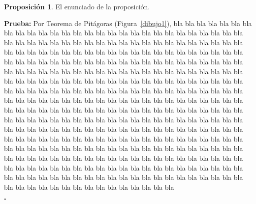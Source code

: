 \documentclass[12pt]{book}%
\theoremstyle{definition}%
\newtheorem{prop}{Proposición}[chapter]
\newenvironment{pba}{\noindent\textbf{Prueba:}}{\begin{flushright} $\square$ \end{flushright}}
\begin{document}
\begin{prop}\label{prop}
El enunciado de la proposición.
\end{prop}
\begin{pba}
Por Teorema de Pitágoras (Figura~\ref{dibujo1}), bla bla bla bla bla bla bla bla bla bla bla bla bla bla bla bla bla bla bla bla bla bla bla bla bla bla bla bla bla bla bla bla bla bla bla bla bla bla bla bla bla bla bla bla bla bla bla bla bla bla bla bla bla bla bla bla bla bla bla bla bla bla bla bla bla bla bla bla bla bla bla bla bla bla bla bla bla bla bla bla bla bla bla bla bla bla bla bla bla bla bla bla bla bla bla bla bla bla bla bla bla bla bla bla bla bla bla bla bla bla bla bla bla bla bla bla bla bla bla bla bla bla bla bla bla bla bla bla bla bla bla bla bla bla bla bla bla bla bla bla bla bla bla bla bla bla bla bla bla bla bla bla bla bla bla bla bla bla bla bla bla bla bla bla bla bla bla bla bla bla bla bla bla bla bla bla bla bla bla bla bla bla bla bla bla bla bla bla bla bla bla bla bla bla bla bla bla bla bla bla bla bla bla bla bla bla bla bla bla bla bla bla bla bla bla bla bla bla bla bla bla bla bla bla bla bla bla bla bla bla bla bla bla bla bla bla bla bla bla bla bla bla bla bla bla bla bla bla bla bla bla bla bla bla bla bla bla bla bla bla bla bla bla bla bla bla bla bla bla bla bla bla bla bla bla bla bla bla bla bla bla bla bla bla bla bla bla bla bla bla bla bla bla bla bla bla bla bla bla bla bla bla bla bla bla bla bla bla bla bla bla bla bla bla bla bla bla bla bla bla bla bla bla bla bla bla bla bla bla bla bla bla bla bla bla bla bla bla bla bla bla bla bla bla bla bla bla bla bla bla bla bla bla bla bla bla bla bla 



\end{pba}
\end{document}
